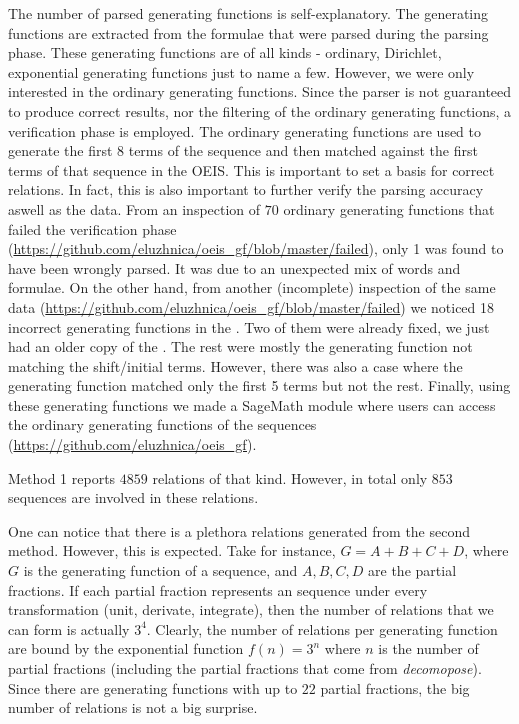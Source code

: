 The number of parsed generating functions is self-explanatory. The generating functions are extracted from the formulae that were parsed during the parsing phase.
These generating functions are of all kinds - ordinary, Dirichlet, exponential generating functions 
just to name a few. However, we were only interested in the ordinary generating functions. 
Since the parser is not guaranteed to produce correct results, nor the filtering of the ordinary
generating functions, a verification phase is employed. The ordinary generating functions are used
to generate the first 8 terms of the sequence and then matched against the first terms of that 
sequence in the OEIS. This is important to set a basis for correct relations. In fact, this is also
important to further verify the parsing accuracy aswell as the \oeis data. 
From an inspection of $70$ ordinary generating functions that failed the verification phase (\url{https://github.com/eluzhnica/oeis_gf/blob/master/failed}), only 1 was found to have been wrongly parsed. It was due to an unexpected mix of words and formulae.
On the other hand, from another (incomplete) inspection of the same data (\url{https://github.com/eluzhnica/oeis_gf/blob/master/failed}) we noticed 18 incorrect generating functions
in the \oeis.  Two of them were already fixed, we just had an older copy of the \oeis. The rest were mostly the generating function not matching the shift/initial terms. However, there was also
a case where the generating function matched only the first 5 terms but not the rest. 
Finally, using these generating functions we made a SageMath module where users can 
access the ordinary generating functions of the sequences (\url{https://github.com/eluzhnica/oeis_gf}).

Method 1 reports $4859$ relations of that kind. However, in total only $853$ sequences are involved in these relations.

One can notice that there is a plethora relations generated from the second method. However, this is expected.
Take for instance, $G = A + B + C + D$, where $G$ is the generating function of a sequence, and $A,B,C, D$ are the
partial fractions. If each partial fraction represents an \oeis sequence under every transformation (unit, derivate,
integrate), then the number of relations that we can form is actually $3^4$. Clearly,
the number of relations per generating function are bound by the exponential function $f(n) = 3^n$ where $n$ is the 
number of partial fractions (including the partial fractions that come from \emph{decomopose}). Since there are generating functions
with up to $22$ partial fractions, the big number of relations is not a big surprise.

